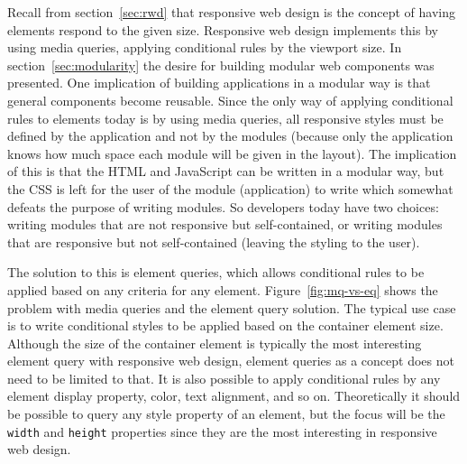 \documentclass[a4paper,11pt]{kth-mag}
\newcommand{\code}[1]{\texttt{#1}}
\newcommand\abbr[2][]{\uppercase{#2}\ifthenelse{\equal{#1}{}}%
                     {}{#1}}
\begin{document}
      Recall from section~\ref{sec:rwd} that responsive web design is the concept of having elements respond to the given size.
      Responsive web design implements this by using media queries, applying conditional rules by the viewport size.
      In section~\ref{sec:modularity} the desire for building modular web components was presented.
      One implication of building applications in a modular way is that general components become reusable.
      Since the only way of applying conditional rules to elements today is by using media queries, all responsive styles must be defined by the application and not by the modules (because only the application knows how much space each module will be given in the layout).
      The implication of this is that the \abbr{html} and JavaScript can be written in a modular way, but the \abbr{css} is left for the user of the module (application) to write which somewhat defeats the purpose of writing modules.
      So developers today have two choices: writing modules that are not responsive but self-contained, or writing modules that are responsive but not self-contained (leaving the styling to the user).

      The solution to this is element queries, which allows conditional rules to be applied based on any criteria for any element.
      Figure~\ref{fig:mq-vs-eq} shows the problem with media queries and the element query solution.
      The typical use case is to write conditional styles to be applied based on the container element size.
      Although the size of the container element is typically the most interesting element query with responsive web design, element queries as a concept does not need to be limited to that.
      It is also possible to apply conditional rules by any element display property, color, text alignment, and so on.
      Theoretically it should be possible to query any style property of an element, but the focus will be the \code{width} and \code{height} properties since they are the most interesting in responsive web design.
\end{document}
